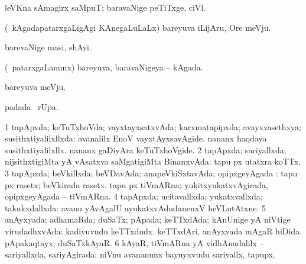 {{{{{{\begin{center}
{{\bentry
{} 
\gl{\nA}
\expl{}
\bmng
leVKna sAmagirx saMpuT; baravaNige peTiTxge, ciVl. 
\emng
\eentry

\bentry
{} 
\gl{\nA}
\expl{}
\bmng
(\kanmu\ kAgadapatarxgaLigAgi KAnegaLuLaLx) bareyuva iLijAru, Ore meVju. 
\emng
\eentry

\bentry
{} 
\gl{\nA}
\expl{}
\bmng
barevaNige masi, shAyi. 
\emng
\eentry

\bentry
{} 
\gl{\nA}
\expl{}
\bmng
{} 
\emng
\eentry

\bentry
{} 
\gl{\nA}
\expl{}
\bmng
(\kanmu\ patarxgaLanunx) bareyuva, baravaNigeya -- kAgada. 
\emng
\eentry

\bentry
{} 
\gl{\nA}
\expl{}
\bmng
bareyuva meVju. 
\emng
\eentry

\bentry
{} 
\gl{\kirx}
\expl{}
\bmng
{} padada \BUkaq\ rUpa. 
\emng
\eentry

\bentry
{} 
\gl{\saMkiSx}
\expl{}
\bmng
{} 
\emng
\eentry

\bentry
{} 
\gl{\gu}
\expl{}
\bmng
\bnum
\num{1} tapApxda; keTuTxhoVda; vayxtayxsatxvAda; karxmatapipxda; avayxvasethxya; susithxtiyalilxllxda:  avanalilx EnoV vayxtAyxsavAgide.  nananx haqdaya susithxtiyalilxllx.  nananx gaDiyAra keTuTxhoVgide. 
\num{2} tapApxda; sariyallxda; nijsithxtigiMta yA vAsatxva saMgatigiMta BinanxvAda:  tapu px utatxra koTTx. 
\num{3} tapApxda; beVkillxda; beVDavAda; anapeVkiSxtavAda; opipxgeyAgada :  tapu px rasetx; beVkirada rasetx.  tapu px tiVmARna; yukitxyukatxvAgirada, opipxgeyAgada -- tiVmARna. 
\num{4} tapApxda; ucitavallxda; yukatxvallxda; takukxdallxda:  avanu yAvAgalU ayukatxvAdudanenxV heVLutAtxne. 
\num{5} anAyxyada; adhamaRda; duSaTx; pApada; keTTxdAda; kAnUnige yA niVtige virudadhxvAda:  kadiyuvudu keTTxdudx.  keTTxdAri, anAyxyada mAgaR hiDida.  pApakaqtayx; duSaTxkAyaR. 
\num{6} kAyaR, tiVmARna yA vidhAnadalilx -- sariyallxda, sariyAgirada:  niVnu avananunx bayuyxvudu sariyallx, tapupx. 
\enum
\emng

}}
\end{center}}}}}}}
